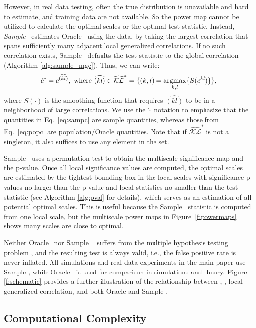 \documentclass[11pt]{extarticle}
\begin{document}
However, in real data testing, often the true distribution is unavailable and hard to estimate, and training data are not available.
So the power map cannot be utilized to calculate the optimal scales or the optimal test statistic.
Instead, \emph{Sample} \Mgc~estimates Oracle \Mgc~using the data, by taking the largest correlation that spans sufficiently many adjacent local generalized correlations.
If no such correlation exists, Sample \Mgc~defaults the test statistic to the global correlation (Algorithm \ref{alg:sample_mgc}).
Thus, we can write:
\begin{equation} \label{eq:sampc}
\hat{\GG}^{*} =  c^{\widehat{(kl)}}, \text{ where } \widehat{(kl)} \in \widehat{\mathcal{KL}}^*  =\{(k,l)=\argmax_{k,l}\{S(\GG^{kl})\}\},
\end{equation}
where $S(\cdot)$ is the smoothing function that requires $\widehat{(kl)}$ to be in a neighborhood of large correlations. We use the $\hat{\cdot}$ notation to emphasize that the quantities in Eq.~\ref{eq:sampc} are sample quantities, whereas those from Eq.~\ref{eq:popc} are population/Oracle quantities. Note that if $\widehat{\mathcal{KL}}^*$ is not a singleton, it also suffices to use any element in the set.

Sample \Mgc~uses a permutation test to obtain the multiscale significance map and the p-value.
%
Once all local significance values are computed, the optimal scales are estimated by the tightest bounding box in the local scales with significance p-values no larger than the p-value and local statistics no smaller than the test statistic (see Algorithm \ref{alg:pval} for details), which serves as an estimation of all potential optimal scales. This is useful because the Sample \Mgc~statistic is computed from one local scale, but the multiscale power maps in Figure~\ref{f:powermaps}  shows many scales are close to optimal.

Neither Oracle \Mgc~nor Sample \Mgc~ suffers from the multiple hypothesis testing problem \cite{Benjamini1995}, and the resulting test is always valid, i.e., the false positive rate is never inflated. All simulations and real data experiments in the main paper use Sample \Mgc,  while Oracle \Mgc~is used for comparison in simulations and theory. Figure \ref{f:schematic} provides a further illustration of the relationship between \Mantel, \Mcorr, local generalized correlation, and both Oracle and Sample \Mgc.

\subsection{Computational Complexity}
\end{document}
